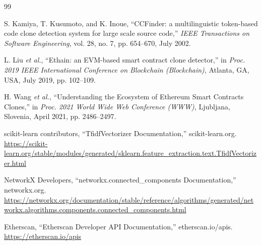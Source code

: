 \documentclass[12pt,a4paper]{article}
\begin{document}
\newpage
\begin{thebibliography}{99}

S. Kamiya, T. Kusumoto, and K. Inoue, ``CCFinder: a multilinguistic token-based code clone detection system for large scale source code,'' \textit{IEEE Transactions on Software Engineering}, vol. 28, no. 7, pp. 654--670, July 2002.

L. Liu \textit{et al.}, ``Ethain: an EVM-based smart contract clone detector,'' in \textit{Proc. 2019 IEEE International Conference on Blockchain (Blockchain)}, Atlanta, GA, USA, July 2019, pp. 102--109.

H. Wang \textit{et al.}, ``Understanding the Ecosystem of Ethereum Smart Contracts Clones,'' in \textit{Proc. 2021 World Wide Web Conference (WWW)}, Ljubljana, Slovenia, April 2021, pp. 2486--2497.

scikit-learn contributors, ``TfidfVectorizer Documentation,'' scikit-learn.org. \url{https://scikit-learn.org/stable/modules/generated/sklearn.feature_extraction.text.TfidfVectorizer.html}

NetworkX Developers, ``networkx.connected\_components Documentation,'' networkx.org. \url{https://networkx.org/documentation/stable/reference/algorithms/generated/networkx.algorithms.components.connected_components.html}

Etherscan, ``Etherscan Developer API Documentation,'' etherscan.io/apis. \url{https://etherscan.io/apis}

\end{thebibliography}
\end{document}
